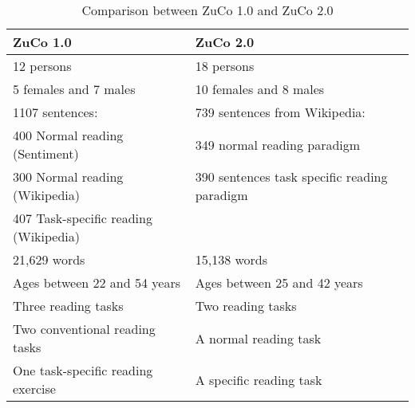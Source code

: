 \documentclass[journal]{IEEEtran}
\begin{document}
\begin{table*}[!t]
	\renewcommand{\arraystretch}{1.3}
	\caption{\large Comparison between ZuCo 1.0 and ZuCo 2.0}
	\label{tab:compare_zuco1_zuco2}
	\centering
	\fontsize{12pt}{12pt}\selectfont
	\begin{tabular}{|l|l|l|}
		
		\hline
		ZuCo 1.0                              & ZuCo 2.0                                     \\ \hline
		12 persons                            & 18 persons                                   \\ \hline
		5 females and 7 males                 & 10 females and 8 males                       \\ \hline
		1107 sentences:                       & 739 sentences from Wikipedia:                \\
		400 Normal reading (Sentiment)        & 349 normal reading paradigm                  \\
		300 Normal reading (Wikipedia)        & 390 sentences task specific reading paradigm \\
		407 Task-specific reading (Wikipedia) &                                              \\ \hline
		21,629 words                          & 15,138 words                                 \\ \hline
		Ages between 22 and 54 years          & Ages between 25 and 42 years                 \\ \hline
		Three reading tasks                   & Two reading tasks                            \\ \hline
		Two conventional reading tasks        & A normal reading task                        \\ \hline
		One task-specific reading exercise    & A specific reading task                      \\ \hline
	\end{tabular}
\end{table*}
\end{document}
